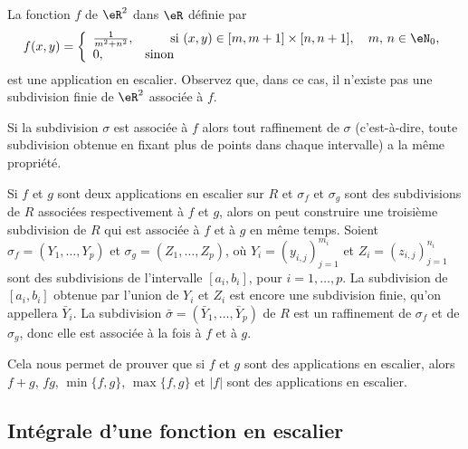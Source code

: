 \begin{example}
	La fonction \( f\) de \( \eR^2\) dans \( \eR\) définie par
	\begin{equation}
		f(x,y)=\left\{
		\begin{array}{ll}
			\frac{1}{m^2+n^2}, & \qquad \textrm{si } (x,y) \in [m,m+1]\times[n,n+1], \quad m,\,n\in\eN_0, \\
			0,                 & \textrm{sinon}
		\end{array}\right.
	\end{equation}
	est une application en escalier. Observez que, dans ce cas, il n'existe pas une subdivision finie de \( \eR^2\) associée à \( f\).
\end{example}
\begin{remark}
	Si la subdivision \( \sigma\) est associée à \( f\) alors tout raffinement de \( \sigma\) (c'est-à-dire, toute subdivision obtenue en fixant plus de points dans chaque intervalle) a la même propriété.

	Si \( f\) et \( g\) sont deux applications en escalier sur \( R\) et \( \sigma_f\) et \( \sigma_g\) sont des subdivisions de \( R\) associées respectivement à \( f\) et \( g\), alors on peut construire une troisième subdivision de \( R\) qui est associée à \( f\) et à \( g\) en même temps. Soient \( \sigma_f=(Y_{1},\ldots, Y_{p})\) et \( \sigma_g=(Z_{1},\ldots, Z_{p})\), où \( Y_{i}=(y_{i,j})_{j=1}^{m_i}\) et \( Z_{i}=(z_{i,j})_{j=1}^{n_i}\) sont des subdivisions de l'intervalle \( [a_i, b_i]\), pour \( i=1,\ldots, p\). La subdivision de \( [a_i, b_i]\) obtenue par l'union de \( Y_i\) et \( Z_i\) est encore une subdivision finie, qu'on appellera \( \bar Y_i\). La subdivision \( \bar \sigma = (\bar Y_{1},\ldots,\bar Y_{p})\) de \( R\) est un raffinement de \( \sigma_f \) et de \( \sigma_g\), donc elle est associée à la fois à \( f\) et à \( g\).

	Cela nous permet de prouver que si \( f\) et \( g\) sont des applications en escalier, alors \( f+g\), \( fg\), \( \min\{f,g\}\), \( \max\{f,g\}\) et \( |f|\) sont des applications en escalier.
\end{remark}

\subsection{Intégrale d'une fonction en escalier}

